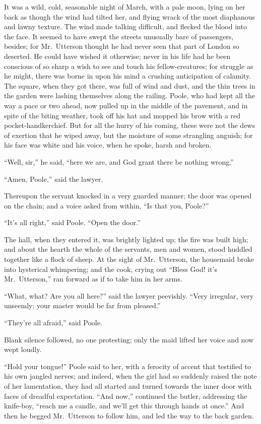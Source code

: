 \documentclass[12pt,openright]{book}
\begin{document}
It was a wild, cold, seasonable night of March, with a pale moon, lying on her back as though the wind had tilted her, and flying wrack of the most diaphanous and lawny texture. The wind made talking difficult, and flecked the blood into the face. It seemed to have swept the streets unusually bare of passengers, besides; for Mr. Utterson thought he had never seen that part of London so deserted. He could have wished it otherwise; never in his life had he been conscious of so sharp a wish to see and touch his fellow-creatures; for struggle as he might, there was borne in upon his mind a crushing anticipation of calamity. The square, when they got there, was full of wind and dust, and the thin trees in the garden were lashing themselves along the railing. Poole, who had kept all the way a pace or two ahead, now pulled up in the middle of the pavement, and in spite of the biting weather, took off his hat and mopped his brow with a red pocket-handkerchief. But for all the hurry of his coming, these were not the dews of exertion that he wiped away, but the moisture of some strangling anguish; for his face was white and his voice, when he spoke, harsh and broken.

“Well, sir,” he said, “here we are, and God grant there be nothing wrong.”

“Amen, Poole,” said the lawyer.

Thereupon the servant knocked in a very guarded manner; the door was opened on the chain; and a voice asked from within, “Is that you, Poole?”

“It’s all right,” said Poole. “Open the door.”

The hall, when they entered it, was brightly lighted up; the fire was built high; and about the hearth the whole of the servants, men and women, stood huddled together like a flock of sheep. At the sight of Mr. Utterson, the housemaid broke into hysterical whimpering; and the cook, crying out “Bless God! it’s Mr. Utterson,” ran forward as if to take him in her arms.

“What, what? Are you all here?” said the lawyer peevishly. “Very irregular, very unseemly; your master would be far from pleased.”

“They’re all afraid,” said Poole.

Blank silence followed, no one protesting; only the maid lifted her voice and now wept loudly.

“Hold your tongue!” Poole said to her, with a ferocity of accent that testified to his own jangled nerves; and indeed, when the girl had so suddenly raised the note of her lamentation, they had all started and turned towards the inner door with faces of dreadful expectation. “And now,” continued the butler, addressing the knife-boy, “reach me a candle, and we’ll get this through hands at once.” And then he begged Mr. Utterson to follow him, and led the way to the back garden.
\end{document}
